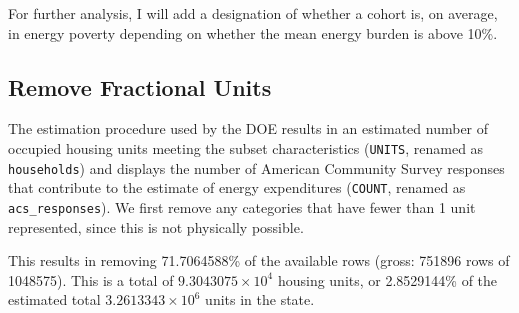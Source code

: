 \documentclass[]{article}
\newenvironment{Shaded}{\begin{snugshade}}{\end{snugshade}}
\newcommand{\CommentTok}[1]{\textcolor[rgb]{0.56,0.35,0.01}{\textit{#1}}}
\newcommand{\DecValTok}[1]{\textcolor[rgb]{0.00,0.00,0.81}{#1}}
\newcommand{\KeywordTok}[1]{\textcolor[rgb]{0.13,0.29,0.53}{\textbf{#1}}}
\newcommand{\NormalTok}[1]{#1}
\newcommand{\OperatorTok}[1]{\textcolor[rgb]{0.81,0.36,0.00}{\textbf{#1}}}
\newcommand{\StringTok}[1]{\textcolor[rgb]{0.31,0.60,0.02}{#1}}
\begin{document}
For further analysis, I will add a designation of whether a cohort is,
on average, in energy poverty depending on whether the mean energy
burden is above 10\%.

\begin{Shaded}
\end{Shaded}

\hypertarget{remove-fractional-units}{%
\subsection{Remove Fractional Units}\label{remove-fractional-units}}

The estimation procedure used by the DOE results in an estimated number
of occupied housing units meeting the subset characteristics
(\texttt{UNITS}, renamed as \texttt{households}) and displays the number
of American Community Survey responses that contribute to the estimate
of energy expenditures (\texttt{COUNT}, renamed as
\texttt{acs\_responses}). We first remove any categories that have fewer
than 1 unit represented, since this is not physically possible.

This results in removing 71.7064588\% of the available rows (gross:
751896 rows of 1048575). This is a total of
\ensuremath{9.3043075\times 10^{4}} housing units, or 2.8529144\% of the
estimated total \ensuremath{3.2613343\times 10^{6}} units in the state.

\begin{Shaded}
\end{Shaded}
\end{document}
